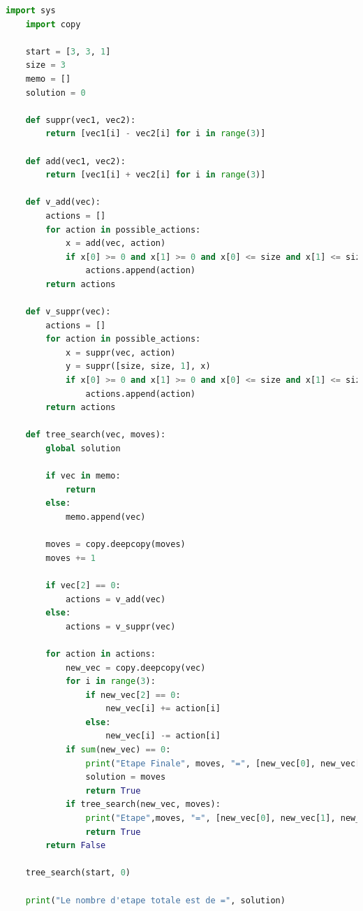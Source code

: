 \documentclass{article}
\begin{document}
\begin{lstlisting}[language=Python, caption=Code Python]
    import sys
    import copy
    
    start = [3, 3, 1]
    size = 3
    memo = []
    solution = 0
    
    def suppr(vec1, vec2):
        return [vec1[i] - vec2[i] for i in range(3)]
    
    def add(vec1, vec2):
        return [vec1[i] + vec2[i] for i in range(3)]
    
    def v_add(vec):
        actions = [] 
        for action in possible_actions:
            x = add(vec, action) 
            if x[0] >= 0 and x[1] >= 0 and x[0] <= size and x[1] <= size and (x[0] >= x[1] or x[0] == 0) and (y[0] >= y[1] or y[0] == 0):
                actions.append(action)        
        return actions 
        
    def v_suppr(vec):
        actions = []
        for action in possible_actions:
            x = suppr(vec, action)
            y = suppr([size, size, 1], x)
            if x[0] >= 0 and x[1] >= 0 and x[0] <= size and x[1] <= size and (x[0] >= x[1] or x[0] == 0) and (y[0] >= y[1] or y[0] == 0):
                actions.append(action)
        return actions
    
    def tree_search(vec, moves):
        global solution
    
        if vec in memo:
            return
        else:
            memo.append(vec)
    
        moves = copy.deepcopy(moves)
        moves += 1
    
        if vec[2] == 0: 
            actions = v_add(vec)
        else:
            actions = v_suppr(vec)
    
        for action in actions:
            new_vec = copy.deepcopy(vec)
            for i in range(3):
                if new_vec[2] == 0:
                    new_vec[i] += action[i]
                else:
                    new_vec[i] -= action[i]
            if sum(new_vec) == 0:
                print("Etape Finale", moves, "=", [new_vec[0], new_vec[1], new_vec[2], size-new_vec[0], size-new_vec[1]])
                solution = moves
                return True
            if tree_search(new_vec, moves):
                print("Etape",moves, "=", [new_vec[0], new_vec[1], new_vec[2], size-new_vec[0], size-new_vec[1]])
                return True
        return False
    
    tree_search(start, 0)
    
    print("Le nombre d'etape totale est de =", solution)
    
    
    
    
    
\end{lstlisting}
\end{document}
